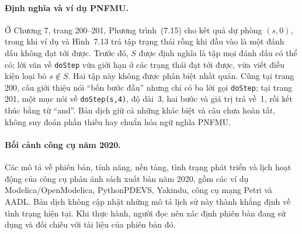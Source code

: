 \paragraph{Định nghĩa và ví dụ PNFMU.}
Ở Chương 7, trang 200--201, Phương trình~(7.15) cho kết quả dự phòng \((s,0)\), trong khi ví dụ và Hình~7.13 trả tập trạng thái rỗng khi đầu vào là một đánh dấu không đạt tới được. Trước đó, \(S\) được định nghĩa là tập mọi đánh dấu có thể có; lời văn về \texttt{doStep} vừa giới hạn ở các trạng thái đạt tới được, vừa viết điều kiện loại bỏ \(s\notin S\). Hai tập này không được phân biệt nhất quán. Cũng tại trang 200, câu giới thiệu nói ``bốn bước đầu'' nhưng chỉ có ba lời gọi \texttt{doStep}; tại trang 201, một mục nói về \texttt{doStep(s,4)}, độ dài~3, hai bước và giá trị trả về~1, rồi kết thúc bằng từ ``and''. Bản dịch giữ cả những khác biệt và câu chưa hoàn tất, không suy đoán phần thiếu hay chuẩn hóa ngữ nghĩa PNFMU.

\paragraph{Bối cảnh công cụ năm 2020.}
Các mô tả về phiên bản, tính năng, nền tảng, tình trạng phát triển và lịch hoạt động của công cụ phản ánh sách xuất bản năm 2020, gồm các ví dụ Modelica/OpenModelica, PythonPDEVS, Yakindu, công cụ mạng Petri và AADL. Bản dịch không cập nhật những mô tả lịch sử này thành khẳng định về tình trạng hiện tại. Khi thực hành, người đọc nên xác định phiên bản đang sử dụng và đối chiếu với tài liệu của phiên bản đó.
